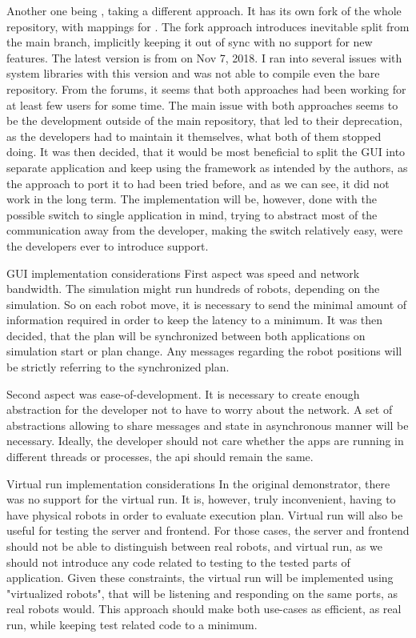 Another one being {\ofnode}, taking a different approach. It has its own fork of the whole {\of} repository, with mappings for {\cmake}. The fork approach introduces inevitable split from the main branch, implicitly keeping it out of sync with no support for new features. \br
The latest version is from on Nov 7, 2018. I ran into several issues with system libraries with this version and was not able to compile even the bare repository.\br\br
From the forums, it seems that both approaches had been working for at least few users for some time. The main issue with both approaches seems to be the development outside of the main repository, that led to their deprecation, as the developers had to maintain it themselves, what both of them stopped doing.
It was then decided, that it would be most beneficial to split the GUI into separate application and keep using the framework as intended by the authors, as the approach to port it to {\cmake} had been tried before, and as we can see, it did not work in the long term.\br\br
The implementation will be, however, done with the possible switch to single application in mind, trying to abstract most of the communication away from the developer, making the switch relatively easy, were the developers ever to introduce {\cmake} support.

\sec GUI implementation considerations
First aspect was speed and network bandwidth. The simulation might run hundreds of robots, depending on the simulation. So on each robot move, it is necessary to send the minimal amount of information required in order to keep the latency to a minimum. 
It was then decided, that the plan will be synchronized between both applications on simulation start or plan change. Any messages regarding the robot positions will be strictly referring to the synchronized plan.

Second aspect was ease-of-development. It is necessary to create enough abstraction for the developer not to have to worry about the network. A set of abstractions allowing to share messages and state in asynchronous manner will be necessary. Ideally, the developer should not care whether the apps are running in different threads or processes, the api should remain the same.

\sec Virtual run implementation considerations
In the original demonstrator, there was no support for the virtual run. It is, however, truly inconvenient, having to have physical robots in order to evaluate execution plan. Virtual run will also be useful for testing the server and frontend. For those cases, the server and frontend should not be able to distinguish between real robots, and virtual run, as we should not introduce any code related to testing to the tested parts of application. Given these constraints, the virtual run will be implemented using "virtualized robots", that will be listening and responding on the same ports, as real robots would. This approach should make both use-cases as efficient, as real run, while keeping test related code to a minimum.

